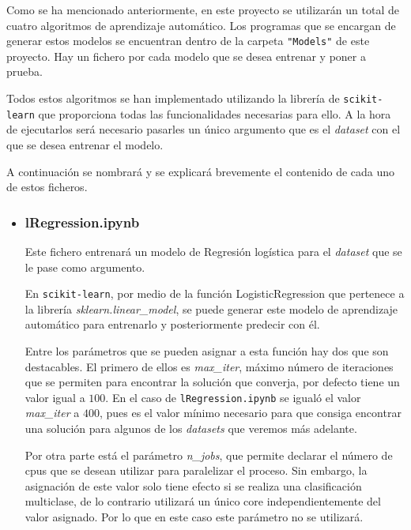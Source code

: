 \documentclass[a4paper, 12pt]{book}
\begin{document}
Como se ha mencionado anteriormente, en este proyecto se utilizarán un total de cuatro algoritmos de aprendizaje automático. Los programas que se encargan de generar estos modelos se encuentran dentro de la carpeta \texttt{"Models"} de este proyecto. Hay un fichero por cada modelo que se desea entrenar y poner a prueba.

Todos estos algoritmos se han implementado utilizando la librería de \texttt{scikit-learn} que proporciona todas las funcionalidades necesarias para ello. A la hora de ejecutarlos será necesario pasarles un único argumento que es el \textit{dataset} con el que se desea entrenar el modelo.

A continuación se nombrará y se explicará brevemente el contenido de cada uno de estos ficheros.

\begin{itemize}

\item \subsubsection{lRegression.ipynb}
\label{subsubsec:lRegression}

Este fichero entrenará un modelo de Regresión logística para el \textit{dataset} que se le pase como argumento.

En \texttt{scikit-learn}, por medio de la función LogisticRegression\cite{LogisticRegressionDoc} que pertenece a la librería \textit{sklearn.linear\_model}, se puede generar este modelo de aprendizaje automático para entrenarlo y posteriormente predecir con él. 

Entre los parámetros que se pueden asignar a esta función hay dos que son destacables. El primero de ellos es \textit{max\_iter}, máximo número de iteraciones que se permiten para encontrar la solución que converja, por defecto tiene un valor igual a $100$. En el caso de \texttt{lRegression.ipynb} se igualó el valor \textit{max\_iter} a $400$, pues es el valor mínimo necesario para que consiga encontrar una solución para algunos de los \textit{datasets} que veremos más adelante.

Por otra parte está el parámetro \textit{n\_jobs}, que permite declarar el número de cpus que se desean utilizar para paralelizar el proceso. Sin embargo, la asignación de este valor solo tiene efecto si se realiza una clasificación multiclase, de lo contrario utilizará un único core independientemente del valor asignado. Por lo que en este caso este parámetro no se utilizará.


\end{itemize}
\end{document}
